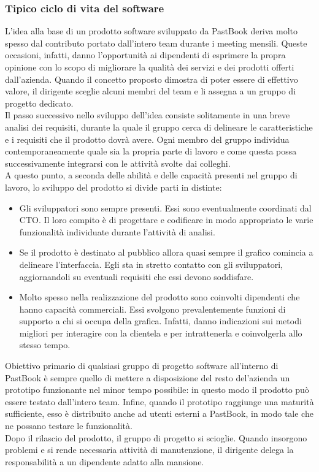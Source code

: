 			\subsubsection{Tipico ciclo di vita del software}
				L'idea alla base di un prodotto software sviluppato da PastBook deriva molto spesso dal contributo portato
				dall'intero team durante i meeting mensili. Queste occasioni, infatti, danno l'opportunità ai dipendenti di esprimere
				la propra opinione con lo scopo di migliorare la qualità dei servizi e dei prodotti offerti dall'azienda. Quando il
				concetto proposto dimostra di poter essere di effettivo valore, il dirigente sceglie alcuni membri del team e li
				assegna a un gruppo di progetto dedicato.\\
				Il passo successivo nello sviluppo dell'idea consiste solitamente in una breve analisi dei requisiti, durante la
				quale il gruppo cerca di delineare le caratteristiche e i requisiti che il prodotto dovrà avere. Ogni membro del
				gruppo individua contemporaneamente quale sia la propria parte di lavoro e come questa possa successivamente
				integrarsi con le attività svolte dai colleghi.\\
				A questo punto, a seconda delle abilità e delle capacità presenti nel gruppo di lavoro, lo sviluppo del prodotto
				si divide parti in distinte:
				\begin{itemize}
					\item Gli sviluppatori sono sempre presenti. Essi sono eventualmente coordinati dal CTO. Il loro compito è
					di progettare e codificare in modo appropriato le varie funzionalità individuate durante l'attività di
					analisi.
					\item Se il prodotto è destinato al pubblico allora quasi sempre il grafico comincia a delineare
					l'interfaccia. Egli sta in stretto contatto con gli sviluppatori, aggiornandoli su eventuali requisiti
					che essi devono soddisfare.
					\item Molto spesso nella realizzazione del prodotto sono coinvolti dipendenti che hanno capacità commerciali.
					Essi svolgono prevalentemente funzioni di supporto a chi si occupa della grafica. Infatti, danno indicazioni
					sui metodi migliori per interagire con la clientela e per intrattenerla e coinvolgerla allo stesso tempo.
				\end{itemize}
				Obiettivo primario di qualsiasi gruppo di progetto software all'interno di PastBook è sempre quello di mettere a
				disposizione del resto del'azienda un prototipo funzionante nel minor tempo possibile: in questo modo il prodotto può
				essere testato dall'intero team. Infine, quando il prototipo raggiunge una maturità sufficiente, esso è distribuito
				anche ad utenti esterni a PastBook, in modo tale che ne possano testare le funzionalità.\\
				Dopo il rilascio del prodotto, il gruppo di progetto si scioglie. Quando insorgono problemi e si rende necessaria
				attività di manutenzione, il dirigente delega la responsabilità a un dipendente adatto alla mansione.
